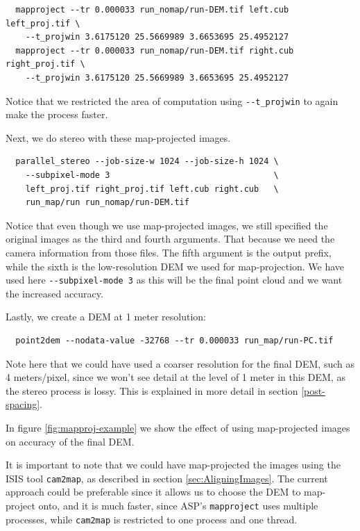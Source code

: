 \begin{verbatim}
  mapproject --tr 0.000033 run_nomap/run-DEM.tif left.cub left_proj.tif \
    --t_projwin 3.6175120 25.5669989 3.6653695 25.4952127
  mapproject --tr 0.000033 run_nomap/run-DEM.tif right.cub right_proj.tif \
    --t_projwin 3.6175120 25.5669989 3.6653695 25.4952127
\end{verbatim}

Notice that we restricted the area of computation using \texttt{-\/-t\_projwin}
to again make the process faster.

Next, we do stereo with these map-projected images.

\begin{verbatim}
  parallel_stereo --job-size-w 1024 --job-size-h 1024 \
    --subpixel-mode 3                                 \
    left_proj.tif right_proj.tif left.cub right.cub   \
    run_map/run run_nomap/run-DEM.tif
\end{verbatim}

Notice that even though we use map-projected images, we still specified
the original images as the third and fourth arguments. That because we
need the camera information from those files.  The fifth argument is
the output prefix, while the sixth is the low-resolution DEM we used for
map-projection. We have used here \texttt{-\/-subpixel-mode 3} as this
will be the final point cloud and we want the increased accuracy.

Lastly, we create a DEM at 1 meter resolution:
\begin{verbatim}
  point2dem --nodata-value -32768 --tr 0.000033 run_map/run-PC.tif
\end{verbatim}
Note here that we could have used a coarser resolution for the final
DEM, such as 4 meters/pixel, since we won't see detail at the level of
1 meter in this DEM, as the stereo process is lossy. This is
explained in more detail in section \ref{post-spacing}.

In figure \ref{fig:mapproj-example} we show the effect of using
map-projected images on accuracy of the final DEM.

It is important to note that we could have map-projected the images
using the ISIS tool \texttt{cam2map}, as described in section
\ref{sec:AligningImages}. The current approach could be preferable since
it allows us to choose the DEM to map-project onto, and it is much faster,
since ASP's \texttt{mapproject} uses multiple processes, while \texttt{cam2map}
is restricted to one process and one thread.

